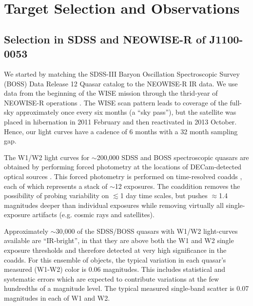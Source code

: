 \documentclass[a4paper,fleqn,usenatbib]{mnras}
\begin{document}
\section{Target Selection and Observations}  

\subsection{Selection in SDSS and NEOWISE-R of J1100-0053}
We started by matching the SDSS-III Baryon Oscillation Spectroscopic
Survey (BOSS) Data Release 12 Quasar catalog \cite[DR12Q;
][]{Paris2017} to the NEOWISE-R IR data. We use data from the beginning of the WISE mission \citep[2010
January; ][]{Wright2010} through the thrid-year of NEOWISE-R
operations \citep[2016 December; ][]{Mainzer2011}. The WISE scan
pattern leads to coverage of the full-sky approximately once every six
months (a ``sky pass''), but the satellite was placed in hibernation
in 2011 February and then reactivated in 2013 October. Hence, our
light curves have a cadence of 6 months with a 32 month sampling gap.

The W1/W2 light curves for $\sim$200,000 SDSS and BOSS spectroscopic
quasars are obtained by performing forced photometry at the locations
of DECam-detected optical sources \citep{Lang2014, Meisner2017a,
Meisner2017b}. This forced photometry is performed on time-resolved
coadds \citep{Lang2014}, each of which represents a stack of $\sim$12
exposures. The coaddition removes the possibility of probing
variability on $\lesssim$1 day time scales, but pushes $\approx$1.4
magnitudes deeper than individual exposures while removing virtually
all single-exposure artifacts (e.g. cosmic rays and satellites).

Approximately $\sim$30,000 of the SDSS/BOSS quasars with W1/W2
light-curves available are ``IR-bright'', in that they are above both
the W1 and W2 single exposure thresholds and therefore detected at
very high significance in the coadds. For this ensemble of objects,
the typical variation in each quasar's measured (W1-W2) color is 0.06
magnitudes.  This includes statistical and systematic errors which are
expected to contribute variations at the few hundredths of a magnitude
level. The typical measured single-band scatter is 0.07 magnitudes in
each of W1 and W2.
\end{document}
